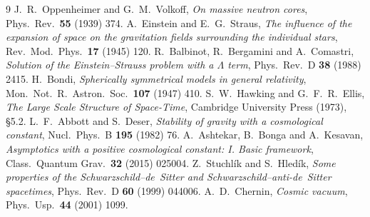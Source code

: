 \documentclass[11pt,a4paper]{article}
\theoremstyle{definition}
\begin{document}
\begin{thebibliography}{9}
 J.~R.~Oppenheimer and G.~M.~Volkoff, \emph{On massive neutron cores}, Phys.\ Rev.\ \textbf{55} (1939) 374.
 A.~Einstein and E.~G.~Straus, \emph{The influence of the expansion of space on the gravitation fields surrounding the individual stars}, Rev.\ Mod.\ Phys.\ \textbf{17} (1945) 120.
 R.~Balbinot, R.~Bergamini and A.~Comastri, \emph{Solution of the Einstein--Strauss problem with a $\Lambda$ term}, Phys.\ Rev.\ D \textbf{38} (1988) 2415.
 H.~Bondi, \emph{Spherically symmetrical models in general relativity}, Mon.\ Not.\ R.\ Astron.\ Soc.\ \textbf{107} (1947) 410.
 S.~W.~Hawking and G.~F.~R.~Ellis, \emph{The Large Scale Structure of Space-Time}, Cambridge University Press (1973), \S5.2.
 L.~F.~Abbott and S.~Deser, \emph{Stability of gravity with a cosmological constant}, Nucl.\ Phys.\ B \textbf{195} (1982) 76.
 A.~Ashtekar, B.~Bonga and A.~Kesavan, \emph{Asymptotics with a positive cosmological constant: I. Basic framework}, Class.\ Quantum Grav.\ \textbf{32} (2015) 025004.
 Z.~Stuchl\'ik and S.~Hled\'ik, \emph{Some properties of the Schwarzschild--de~Sitter and Schwarzschild--anti-de~Sitter spacetimes}, Phys.\ Rev.\ D \textbf{60} (1999) 044006.
 A.~D.~Chernin, \emph{Cosmic vacuum}, Phys.\ Usp.\ \textbf{44} (2001) 1099.
\end{thebibliography}



\end{document}
